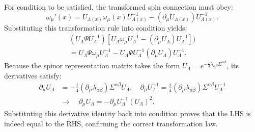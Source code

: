 \begin{subappendices}
For condition  to be satisfied, the transformed spin connection must obey: 
\begin{equation}
  \omega_{\mu}'(x)= U_{\Lambda(x)}\omega_{\mu}(x) U_{\Lambda(x)}^{-1}-(\partial_{\mu}U_{\Lambda(x)})U_{\Lambda(x)}^{-1}.
\end{equation}
Substituting this transformation rule into condition  yields: 
\begin{equation}
\begin{aligned}
    (U_\Lambda \Psi U_\Lambda^{-1})[U_{\Lambda}\omega_{\mu} U_{\Lambda}^{-1}-(\partial_{\mu}U_{\Lambda})U_{\Lambda}^{-1}]) \\
    =U_\Lambda \Psi\omega_{\mu} U_{\Lambda}^{-1}-U_\Lambda \Psi U_\Lambda^{-1}(\partial_{\mu}U_{\Lambda})U_{\Lambda}^{-1}.
\end{aligned}
\end{equation}
Because the spinor representation matrix takes the form $U_\Lambda=e^{-\frac{i}{4}\lambda_{\alpha\beta}\Sigma^{\alpha\beta}}$, its derivatives satisfy: 
\begin{equation}
\begin{aligned}
    \partial_\mu U_\Lambda&=-\frac{i}{4}(\partial_\mu\lambda_{\alpha\beta})\Sigma^{\alpha\beta} U_\Lambda, \quad \partial_\mu U_\Lambda^{-1}=\frac{i}{4}(\partial_\mu\lambda_{\alpha\beta})\Sigma^{\alpha\beta} U_\Lambda^{-1}\\
    &\to \quad \partial_\mu U_\Lambda=-\partial_\mu U_\Lambda^{-1}(U_\Lambda)^2.
\end{aligned}
\end{equation}
Substituting this derivative identity back into condition  proves that the LHS is indeed equal to the RHS, confirming the correct transformation law.
\end{subappendices}

\printbibliography[heading=subbibintoc, title={References for Chapter \thechapter}]